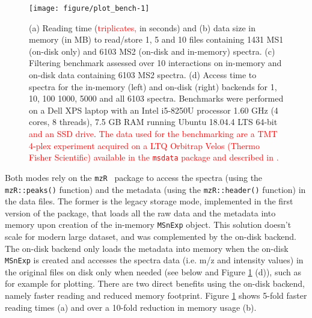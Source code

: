 \documentclass[journal=jacsat,manuscript=article]{achemso}\usepackage[]{graphicx}\usepackage[]{color}
\newenvironment{knitrout}{}{} %
\begin{document}
\begin{figure}[p]
  \centering
\begin{knitrout}
\color{fgcolor}
\texttt{[image: figure/plot\_bench-1]} 

\end{knitrout}
\caption{(a) Reading time (\textcolor{red}{triplicates,} in seconds)
  and (b) data size in memory (in MB) to read/store 1, 5 and 10 files
  containing 1431 MS1 (on-disk only) and 6103 MS2 (on-disk and
  in-memory) spectra. (c) Filtering benchmark assessed over 10
  interactions on in-memory and on-disk data containing 6103 MS2
  spectra.  (d) Access time to spectra for the in-memory (left) and
  on-disk (right) backends for 1, 10, 100 1000, 5000 and all 6103
  spectra. Benchmarks were performed on a Dell XPS laptop with an
  Intel i5-8250U processor 1.60 GHz (4 cores, 8 threads), 7.5 GB RAM
  running Ubuntu 18.04.4 LTS 64-bit \textcolor{red}{and an SSD
    drive}. \textcolor{red}{The data used for the benchmarking are a
    TMT 4-plex experiment acquired on a LTQ Orbitrap Velos (Thermo
    Fisher Scientific) available in the \texttt{msdata} package and
    described in \citep{Gatto:2014}.}}
\label{fig:bench}
\end{figure}

Both modes rely on the \texttt{mzR}~\cite{Chambers:2012} package to
access the spectra (using the \texttt{mzR::peaks()} function) and the
metadata (using the \texttt{mzR::header()} function) in the data
files. The former is the legacy storage mode, implemented in the first
version of the package, that loads all the raw data and the metadata
into memory upon creation of the in-memory \texttt{MSnExp}
object. This solution doesn't scale for modern large dataset, and was
complemented by the on-disk backend. The on-disk backend only loads
the metadata into memory when the on-disk \texttt{MSnExp} is created
and accesses the spectra data (i.e. m/z and intensity values) in the
original files on disk only when needed (see below and Figure
\ref{fig:bench} (d)), such as for example for plotting. There are two
direct benefits using the on-disk backend, namely faster reading and
reduced memory footprint. Figure \ref{fig:bench} shows 5-fold faster
reading times (a) and over a 10-fold reduction in memory usage (b).
\end{document}
